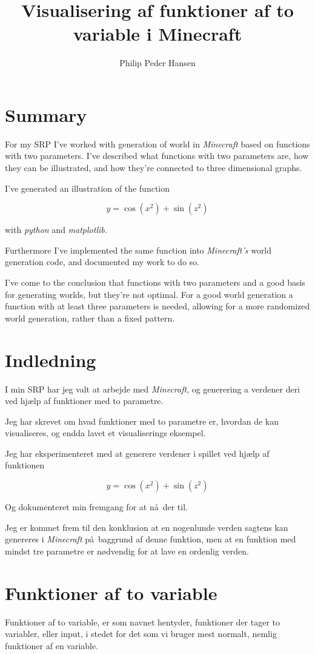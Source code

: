 \documentclass[a4paper,12pt]{report}
\author{Philip Peder Hansen}
\title{Visualisering af funktioner af to variable i Minecraft}
\begin{document}
	\maketitle
	\tableofcontents
	\clearpage
	\chapter{Summary}
		For my SRP I've worked with generation of world in \emph{Minecraft} based on functions with
		two parameters. I've described what functions with two parameters are, how they can be illustrated,
		and how they're connected to three dimensional graphs.

		I've generated an illustration of the function

		\[y = \cos (x^2) + \sin (z^2)\]

		with \emph{python} and \emph{matplotlib}.

		Furthermore I've implemented the same function into \emph{Minecraft's} world generation code,
		and documented my work to do so.

		I've come to the conclusion that functions with two parameters and a good basis for generating worlds,
		but they're not optimal. For a good world generation a function with at least three parameters is needed,
		allowing for a more randomized world generation, rather than a fixed pattern.
	\chapter{Indledning}
		I min SRP har jeg valt at arbejde med \emph{Minecraft}, og generering a verdener
		deri ved hj\ae lp af funktioner med to parametre.

		Jeg har skrevet om hvad funktioner med to parametre er, hvordan de kan visualiseres, og endda
		lavet et visualiserings eksempel.

		Jeg har eksperimenteret med at generere verdener i spillet ved hj\ae lp af funktionen

		\[y = \cos (x^2) + \sin (z^2)\]

		Og dokumenteret min fremgang for at n\aa \ der til.

		Jeg er kommet frem til den konklusion at en nogenlunde verden sagtens kan genereres i \emph{Minecraft}
		p\aa \ baggrund af denne funktion, men at en funktion med mindst tre parametre er n\o dvendig for at lave
		en ordenlig verden.
	\chapter{Funktioner af to variable}
		Funktioner af to variable, er som navnet hentyder, funktioner der tager to variabler, eller input,
		i stedet for det som vi bruger mest normalt, nemlig funktioner af en variable.
\end{document}
